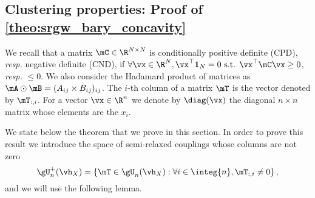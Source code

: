
\subsection{Clustering properties: Proof of \cref{theo:srgw_bary_concavity} \label{sec:srGW_concavity_supp}}
We recall that a matrix $\mC \in \R^{N \times N}$ is conditionally positive definite (CPD), \textit{resp.} negative definite (CND), if $\forall \vx \in \R^{N}, \vx^\top \mathbf{1}_N = 0 \text{ s.t. } \vx^\top \mC \vx \geq 0$, \textit{resp.} $\leq 0$. We also consider the Hadamard product of matrices as $\mA \odot \mB = (A_{ij} \times B_{ij})_{ij}$. The $i$-th column of a matrix $\mT$ is the vector denoted by $\mT_{:,i}$. For a vector $\vx\in \R^{n}$ we denote by $\diag(\vx)$ the diagonal $n \times n$ matrix whose elements are the $x_i$. 

We state below the theorem that we prove in this section.
\baryconcavity*
In order to prove this result we introduce the space of semi-relaxed couplings whose columns are not zero
\begin{equation}
	\label{eq:guplus}
	\gU_{n}^{+}(\vh_X) = \{\mT \in \gU_{n}(\vh_X) : \forall i \in \integ{n}, \mT_{:,i} \neq 0\}\,,
\end{equation}
and we will use the following lemma.




